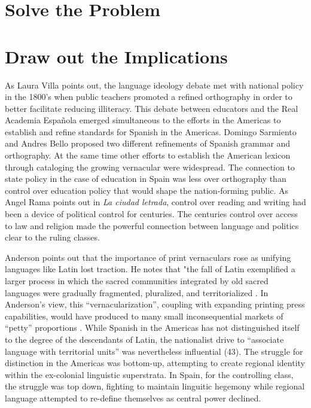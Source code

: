 \documentclass[12pt]{report}
\begin{document}
\section{Solve the Problem}
\section{Draw out the Implications}
As Laura Villa points out, the language ideology debate met with national policy in the 1800's when public teachers promoted a refined orthography in order to better facilitate reducing illiteracy.
This debate between educators and the Real Academia Española emerged simultaneous to the efforts in the Americas to establish and refine standards for Spanish in the Americas.
Domingo Sarmiento and Andres Bello proposed two different refinements of Spanish grammar and orthography.
At the same time other efforts to establish the American lexicon through cataloging the growing vernacular were widespread. 
The connection to state policy in the case of education in Spain was less over orthography than control over education policy that would shape the nation-forming public.
As Angel Rama points out in \textit{La ciudad letrada}, control over reading and writing had been a device of political control for centuries.
The centuries control over access to law and religion made the powerful connection between language and politics clear to the ruling classes.

Anderson points out that the importance of print vernaculars rose as unifying languages like Latin lost traction.
He notes that "the fall of Latin exemplified a larger process in which the sacred communities integrated by old sacred languages were gradually fragmented, pluralized, and territorialized \cite[19]{Anderson2006}. 
In Anderson's view, this \enquote{vernacularization}, coupling with expanding printing press capabilities, would have produced to many small inconsequential markets of \enquote{petty} proportions \cite[43]{Anderson2006}.
While Spanish in the Americas has not distinguished itself to the degree of the descendants of Latin, the nationalist drive to \enquote{associate language with territorial units} was nevertheless influential (43).
The struggle for distinction in the Americas was bottom-up, attempting to create regional identity within the ex-colonial linguistic superstrata.
In Spain, for the controlling class, the struggle was top down, fighting to maintain linguitic hegemony while regional language attempted to re-define themselves as central power declined.
\end{document}
